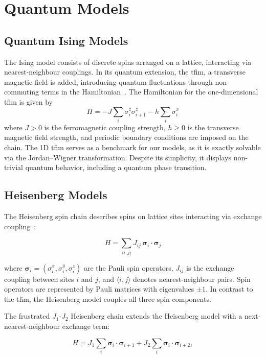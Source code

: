 \documentclass[10pt,a4paper]{article}
\numberwithin{equation}{section}
\begin{document}
\section{Quantum Models}
\subsection{Quantum Ising Models}
The Ising model consists of discrete spins arranged on a lattice, interacting via nearest-neighbour couplings. In its quantum extension, the \gls{tfim}, a transverse magnetic field is added, introducing quantum fluctuations through non-commuting terms in the Hamiltonian~\cite{mpg}. The Hamiltonian for the one-dimensional \gls{tfim} is given by
\begin{equation}
H=-J\sum_i\sigma_i^z\sigma_{i+1}^z-h\sum_i\sigma_i^x
\label{eq:tfim}
\end{equation}
where $J>0$ is the ferromagnetic coupling strength, $h\geq0$ is the transverse magnetic field strength, and periodic boundary conditions are imposed on the chain. The 1D \gls{tfim} serves as a benchmark for our models, as it is exactly solvable via the Jordan–Wigner transformation. Despite its simplicity, it displays non-trivial quantum behavior, including a quantum phase transition.
\subsection{Heisenberg Models}
The Heisenberg spin chain describes spins on lattice sites interacting via exchange coupling~\cite{Heisenberg_1928}:

\begin{equation}
    H = \sum_{\langle i,j \rangle} J_{ij}\,\boldsymbol{\sigma}_i \cdot \boldsymbol{\sigma}_j
\end{equation}

where $\boldsymbol{\sigma}_i = (\sigma_i^x, \sigma_i^y, \sigma_i^z)$ are the Pauli spin operators, $J_{ij}$ is the exchange coupling between sites $i$ and $j$, and $\langle i,j \rangle$ denotes nearest-neighbour pairs. Spin operators are represented by Pauli matrices with eigenvalues $\pm1$. In contrast to the \gls{tfim}, the Heisenberg model couples all three spin components.

The frustrated $J_1$-$J_2$ Heisenberg chain extends the Heisenberg model with a next-nearest-neighbour exchange term:

\begin{equation}
\label{eq:j1j2heisenberg}
    H = J_1 \sum_{i} \boldsymbol{\sigma}_i \cdot \boldsymbol{\sigma}_{i+1} + J_2 \sum_{i} \boldsymbol{\sigma}_i \cdot \boldsymbol{\sigma}_{i+2},
\end{equation}
\end{document}

